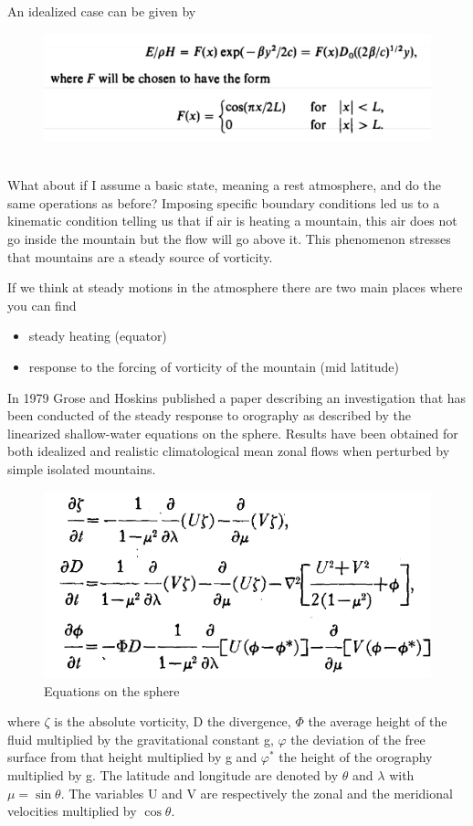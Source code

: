 An idealized case can be given by
\begin{figure}[h!]
	\centering
	\includegraphics[width=0.5\linewidth]{uploads/22image.png}
	\label{fig:enter-label}
\end{figure}




\\What about if I assume a basic state, meaning a rest atmosphere, and do the same operations as before? Imposing specific boundary conditions led us to a kinematic condition telling us that if air is heating a mountain, this air does not go inside the mountain but the flow will go above it. This phenomenon stresses that mountains are a steady source of vorticity.

If we think at steady motions in the atmosphere there are two main places where you can find
\begin{itemize}
	\item steady heating (equator)
	\item response to the forcing of vorticity of the mountain (mid latitude)
\end{itemize}

In 1979 Grose and Hoskins published a paper describing an investigation that has been conducted of the steady response to orography as described by the linearized shallow-water equations on the sphere.
Results have been obtained for both idealized and realistic climatological mean zonal flows when perturbed by simple isolated mountains.

\begin{figure}[h!]
	\centering
	\includegraphics[width=0.5\linewidth]{uploads/19image.png}
	\caption{Equations on the sphere}
	\label{fig: fig 2.2}

\end{figure}
where $\zeta$ is the absolute vorticity, D the divergence, $\Phi$
the average height of the fluid multiplied by the gravitational constant g, $\varphi$ the deviation of the free surface from that height multiplied by g and $\varphi^*$ the height of the orography multiplied by g. The latitude and longitude are denoted by $\theta$ and $\lambda$ with $\mu = \sin \theta$. The variables U and V are respectively the zonal and the meridional velocities multiplied by $\cos \theta$.


